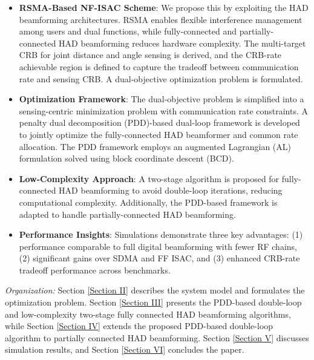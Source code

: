 \documentclass[10pt,journal,twocolumn]{IEEEtran}
\begin{document}
\begin{itemize}  
\item \textbf{RSMA-Based NF-ISAC Scheme}: We propose this by exploiting the HAD beamforming architectures. RSMA enables flexible interference management among users and dual functions, while fully-connected and partially-connected HAD beamforming reduces hardware complexity.  The multi-target CRB for joint distance and angle sensing is derived, and the CRB-rate achievable region is defined to capture the tradeoff between communication rate and sensing CRB. A dual-objective optimization problem is formulated.  

\item \textbf{Optimization Framework}: The dual-objective problem is simplified into a sensing-centric minimization problem with communication rate constraints. A penalty dual decomposition (PDD)-based dual-loop framework is developed to jointly optimize the fully-connected HAD beamformer and common rate allocation. The PDD framework employs an augmented Lagrangian (AL) formulation solved using block coordinate descent (BCD).  

\item \textbf{Low-Complexity Approach}: A two-stage algorithm is proposed for fully-connected HAD beamforming to avoid double-loop iterations, reducing computational complexity. Additionally, the PDD-based framework is adapted to handle partially-connected HAD beamforming.  

\item \textbf{Performance Insights}: Simulations demonstrate three key advantages: (1) performance comparable to full digital beamforming with fewer RF chains, (2) significant gains over SDMA and FF ISAC, and (3) enhanced CRB-rate tradeoff performance across benchmarks.  
\end{itemize}  


\emph{Organization:}   
Section \ref{Section II} describes the system model and formulates the optimization problem. Section \ref{Section III} presents the PDD-based double-loop and low-complexity two-stage fully connected HAD beamforming algorithms, while Section \ref{Section IV} extends the proposed PDD-based double-loop algorithm to partially connected HAD beamforming. Section \ref{Section V} discusses simulation results, and Section \ref{Section VI} concludes the paper.
\end{document}
